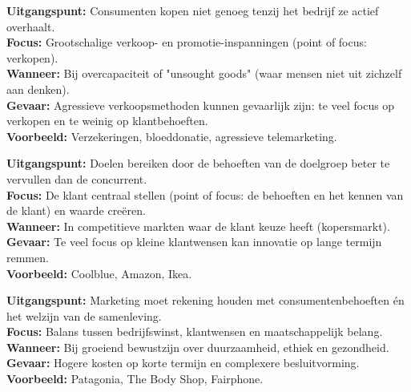 \documentclass[a4paper,11pt]{article}
\begin{document}
\begin{tcolorbox}[schoolstyle, title=3. Verkoopconcept, colframe=schoolBlue!80!black, colback=white]
    \textbf{Uitgangspunt:} Consumenten kopen niet genoeg tenzij het bedrijf ze actief overhaalt. \\
    \textbf{Focus:} Grootschalige verkoop- en promotie-inspanningen (point of focus: verkopen). \\
    \textbf{Wanneer:} Bij overcapaciteit of "unsought goods" (waar mensen niet uit zichzelf aan denken). \\
    \textbf{Gevaar:} Agressieve verkoopsmethoden kunnen gevaarlijk zijn: te veel focus op verkopen en te weinig op klantbehoeften. \\
    \textbf{Voorbeeld:} Verzekeringen, bloeddonatie, agressieve telemarketing.
\end{tcolorbox}

\begin{tcolorbox}[schoolstyle, title=4. Marketingconcept, colframe=schoolBlue!80!black, colback=white]
    \textbf{Uitgangspunt:} Doelen bereiken door de behoeften van de doelgroep beter te vervullen dan de concurrent. \\
    \textbf{Focus:} De klant centraal stellen (point of focus: de behoeften en het kennen van de klant) en waarde creëren. \\
    \textbf{Wanneer:} In competitieve markten waar de klant keuze heeft (kopersmarkt). \\
    \textbf{Gevaar:} Te veel focus op kleine klantwensen kan innovatie op lange termijn remmen. \\
    \textbf{Voorbeeld:} Coolblue, Amazon, Ikea.
\end{tcolorbox}

\begin{tcolorbox}[schoolstyle, title=5. Maatschappelijk Marketingconcept, colframe=schoolBlue!80!black, colback=white]
    \textbf{Uitgangspunt:} Marketing moet rekening houden met consumentenbehoeften én het welzijn van de samenleving. \\
    \textbf{Focus:} Balans tussen bedrijfswinst, klantwensen en maatschappelijk belang. \\
    \textbf{Wanneer:} Bij groeiend bewustzijn over duurzaamheid, ethiek en gezondheid. \\
    \textbf{Gevaar:} Hogere kosten op korte termijn en complexere besluitvorming. \\
    \textbf{Voorbeeld:} Patagonia, The Body Shop, Fairphone.
\end{tcolorbox}
\end{document}
